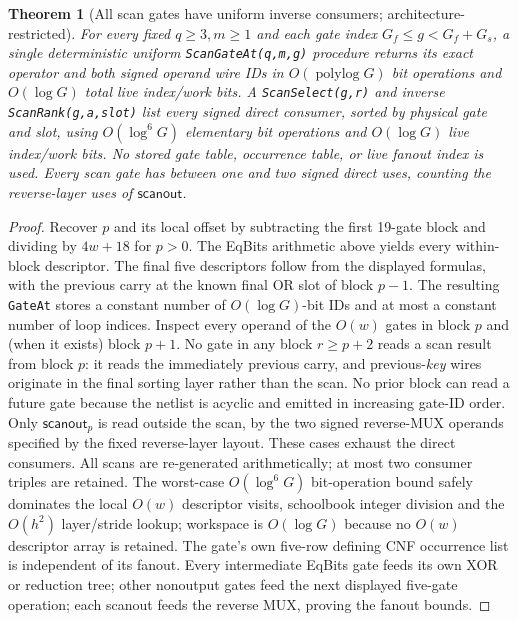 \documentclass[11pt]{article}
\newtheorem{theorem}{Theorem}
\begin{document}
\begin{theorem}[All scan gates have uniform inverse consumers; architecture-restricted]\label{th:scan}
For every fixed $q\ge3,m\ge1$ and each gate index $G_f\le g<G_f+G_s$, a single deterministic uniform \texttt{ScanGateAt(q,m,g)} procedure returns its exact operator and both signed operand wire IDs in $O(\operatorname{polylog}G)$ bit operations and $O(\log G)$ total live index/work bits. A \texttt{ScanSelect(g,r)} and inverse \texttt{ScanRank(g,a,slot)} list every signed direct consumer, sorted by physical gate and slot, using $O(\log^6G)$ elementary bit operations and $O(\log G)$ live index/work bits. No stored gate table, occurrence table, or live fanout index is used. Every scan gate has between one and two signed direct uses, counting the reverse-layer uses of $\mathsf{scanout}$.
\end{theorem}
\begin{proof}
Recover $p$ and its local offset by subtracting the first 19-gate block and dividing by $4w+18$ for $p>0$. The EqBits arithmetic above yields every within-block descriptor. The final five descriptors follow from the displayed formulas, with the previous carry at the known final OR slot of block $p-1$. The resulting \texttt{GateAt} stores a constant number of $O(\log G)$-bit IDs and at most a constant number of loop indices. Inspect every operand of the $O(w)$ gates in block $p$ and (when it exists) block $p+1$. No gate in any block $r\ge p+2$ reads a scan result from block $p$: it reads the immediately previous carry, and previous-\emph{key} wires originate in the final sorting layer rather than the scan. No prior block can read a future gate because the netlist is acyclic and emitted in increasing gate-ID order. Only $\mathsf{scanout}_p$ is read outside the scan, by the two signed reverse-MUX operands specified by the fixed reverse-layer layout. These cases exhaust the direct consumers. All scans are re-generated arithmetically; at most two consumer triples are retained. The worst-case $O(\log^6G)$ bit-operation bound safely dominates the local $O(w)$ descriptor visits, schoolbook integer division and the $O(h^2)$ layer/stride lookup; workspace is $O(\log G)$ because no $O(w)$ descriptor array is retained. The gate's own five-row defining CNF occurrence list is independent of its fanout. Every intermediate EqBits gate feeds its own XOR or reduction tree; other nonoutput gates feed the next displayed five-gate operation; each scanout feeds the reverse MUX, proving the fanout bounds.
\end{proof}
\end{document}

